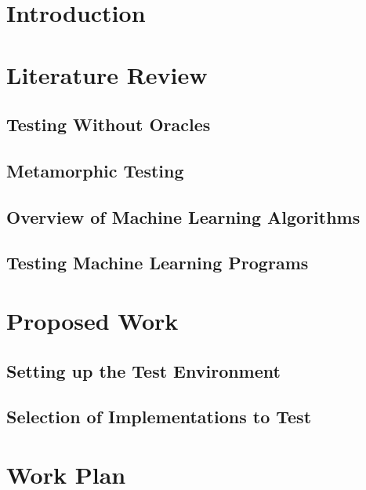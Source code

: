 \documentclass[print,ms]{unothesis}
\begin{document}
	
	\chapter{Introduction}
	
	\chapter{Literature Review}
	\section{Testing Without Oracles}
	\section{Metamorphic Testing}
	\section{Overview of Machine Learning Algorithms}
	\section{Testing Machine Learning Programs}
	
	\chapter{Proposed Work}
	\section{Setting up the Test Environment}
	\section{Selection of Implementations to Test}
	
	\chapter{Work Plan}


\backmatter

\appendix


	
	\nocite{*}
	
	
	
\end{document}
